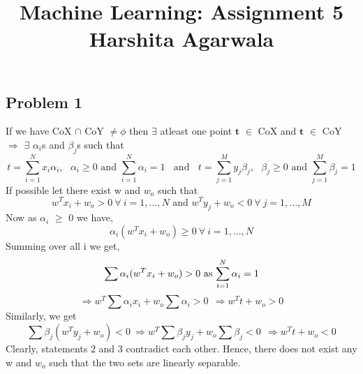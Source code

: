 \documentclass[11pt, a4paper, fleqn]{article}
\begin{document}
\title{Machine Learning: Assignment 5\\
Harshita Agarwala}
\maketitle
\begin{singlespacing}
\section{Problem 1}
If we have CoX $\cap$ CoY $\neq \phi$ then $\exists$ atleast one point $\boldsymbol{t}$ $\in$ CoX and  $\boldsymbol{t}$ $\in$ CoY  
\\
$\Rightarrow$ $\exists$ $\alpha_i$s and $\beta_j$s such that
\begin{equation}
t = \sum_{i=1}^{N}{x_i \alpha_i}, \text{  } \alpha_i \geq 0 \text{  and  } \sum_{i=1}^{N}{\alpha_i} =1
\ \ \ \ \text{and} \ \ \ \
t = \sum_{j=1}^{M}{y_j \beta_j}, \text{  } \beta_j \geq 0 \text{  and  } \sum_{j=1}^{M}{\beta_j} =1
\end{equation}
If possible let there exist w and $w_o$  such that
\begin{equation*}
w^T x_i +w_o > 0  \  \forall \  i = 1, ... , N \text{  and   } w^T y_j + w_o < 0  \ \forall \ j = 1, ... , M
\end{equation*}
Now as  $\alpha_i$ $\geq$ 0 we have,
\begin{equation*}
\alpha_i(w^T x_i +w_o) \geq 0  \  \forall \  i = 1, ... , N 
\end{equation*}
Summing over all i we get,
\begin{equation*}
\sum{\alpha_i(w^T x_i +w_o)} > 0  \text{ as $ \sum_{i=1}^{N}{\alpha_i} =1 $}
\end{equation*}
\begin{equation}
\Rightarrow w^T \sum{\alpha_i x_i} +w_o \sum{\alpha_i} > 0  \ \ 
\Rightarrow w^T t +w_o > 0
\end{equation}
Similarly, we get
\begin{equation}
\sum{\beta_j(w^T y_j +w_o)} < 0 \ 
\Rightarrow w^T \sum{\beta_j y_j} +w_o \sum{\beta_j} < 0  \ \ 
\Rightarrow w^T t +w_o < 0
\end{equation}
Clearly, statements 2 and 3 contradict each other. Hence, there does not exist any w and $w_o$ such that the two sets are linearly separable.


\end{singlespacing}
\end{document}
